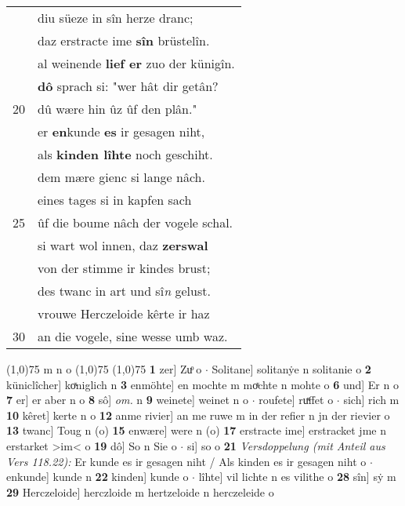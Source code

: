 \documentclass[8pt,a4paper,notitlepage]{article}
\begin{document}
\begin{table}[ht]
\begin{minipage}[t]{0.5\linewidth}
\begin{tabular}{rl}
 & diu süeze in sîn herze dranc;\\ 
 & daz erstracte ime \textbf{sîn} brüstelîn.\\ 
 & al weinende \textbf{lief er} zuo der künigîn.\\ 
 & \textbf{dô} sprach si: "wer hât dir getân?\\ 
20 & dû wære hin ûz ûf den plân."\\ 
 & er \textbf{en}kunde \textbf{es} ir gesagen niht,\\ 
 & als \textbf{kinden lîhte} noch geschiht.\\ 
 & dem mære gienc si lange nâch.\\ 
 & eines tages si in kapfen sach\\ 
25 & ûf die boume nâch der vogele schal.\\ 
 & si wart wol innen, daz \textbf{zerswal}\\ 
 & von der stimme ir kindes brust;\\ 
 & des twanc in art und sî\textit{n} gelust.\\ 
 & vrouwe Herczeloide kêrte ir haz\\ 
30 & an die vogele, sine wesse umb waz.\\ 
\end{tabular}
\scriptsize
\line(1,0){75} \newline
m n o \newline
\line(1,0){75} \newline
\newline
\line(1,0){75} \newline
\textbf{1} zer] Zuͦ o  $\cdot$ Solitane] solitanẏe n solitanie o \textbf{2} küniclîcher] koͯniglich n \textbf{3} enmöhte] en mochte m moͯchte n mohte o \textbf{6} und] Er n o \textbf{7} er] er aber n o \textbf{8} sô] \textit{om.} n \textbf{9} weinete] weinet n o  $\cdot$ roufete] ruͯffet o  $\cdot$ sich] rich m \textbf{10} kêret] kerte n o \textbf{12} anme rivier] an me ruwe m in der refier n jn der rievier o \textbf{13} twanc] Toug n (o) \textbf{15} enwære] were n (o) \textbf{17} erstracte ime] erstracket jme n erstarket >im< o \textbf{19} dô] So n Sie o  $\cdot$ si] so o \textbf{21} \textit{Versdoppelung (mit Anteil aus Vers 118.22):} Er kunde es ir gesagen niht / Als kinden es ir gesagen niht o   $\cdot$ enkunde] kunde n \textbf{22} kinden] kunde o  $\cdot$ lîhte] vil lichte n es vilithe o \textbf{28} sîn] sẏ m \textbf{29} Herczeloide] herczloide m hertzeloide n herczeleide o \newline
\end{minipage}
\end{table}
\end{document}
